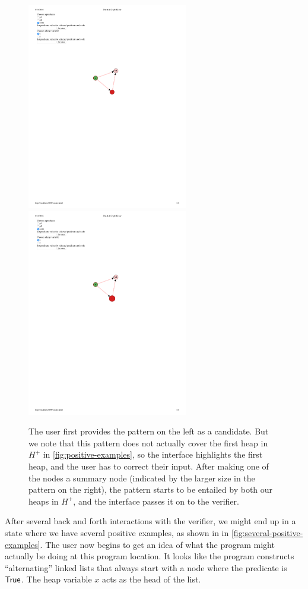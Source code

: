 \begin{figure}
  \centering
  \includegraphics[width=7cm]{fig/candidate3.pdf}
  \includegraphics[width=7cm]{fig/candidate4.pdf}
  \caption{The user first provides the pattern on the left as a candidate. But we note that this pattern does not actually cover the first heap in $H^{+}$ in \autoref{fig:positive-examples}, so the interface highlights the first heap, and the user has to correct their input. After making one of the nodes a summary node (indicated by the larger size in the pattern on the right), the pattern starts to be entailed by both our heaps in $H^{+}$, and the interface passes it on to the verifier.}
  \label{fig:pattern-attempts}
\end{figure}

After several back and forth interactions with the verifier, we might end up in a state
where we have several positive examples, as shown in in
\autoref{fig:several-positive-examples}. The user now begins to get an idea of what the
program might actually be doing at this program location. It looks like the program
constructs ``alternating'' linked lists that always start with a node where the
predicate is $\mathsf{True}$. The heap variable $x$ acts as the head of the list.


